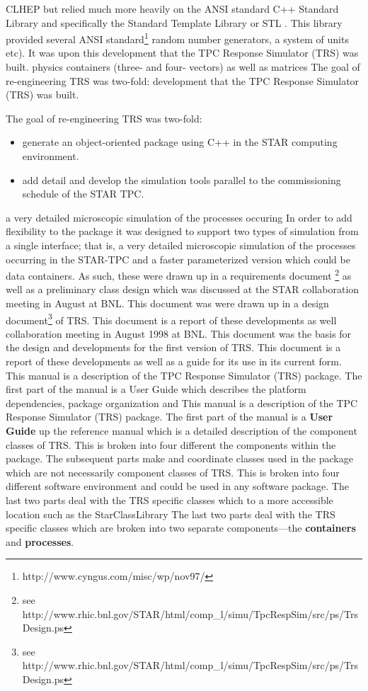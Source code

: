 \documentclass[twoside]{article}
\newcommand{\name}[1]{\textsf{#1}}%
\begin{document}
CLHEP  but relied much more heavily on the
ANSI standard C++ Standard Library and specifically the Standard Template
Library or STL .  This library provided several
ANSI  standard\footnote{http://www.cyngus.com/misc/wp/nov97/} 
random number generators, a system of units etc).  It was upon this
development that the TPC Response Simulator (TRS) was built.
physics containers (three- and four- vectors) as well as matrices
The goal of re-engineering TRS was two-fold:
development that the \name{TPC Response Simulator} (\name{TRS}) was built.

The goal of re-engineering \name{TRS} was two-fold:
\begin{itemize}
  \item generate an object-oriented package using C++ in the
    STAR computing environment.
  \item add detail and develop the simulation tools parallel to the
    commissioning schedule of the STAR TPC.
\end{itemize}
a very detailed microscopic simulation of the processes occuring
In order to add flexibility to the package it was designed to
support two types of simulation from a single interface; that is,
a very detailed microscopic simulation of the processes occurring
in the STAR-TPC and a faster parameterized version which could be
data containers.  As such, these were drawn up in a requirements document
\footnote{see http://www.rhic.bnl.gov/STAR/html/comp\_l/simu/TpcRespSim/src/ps/TrsDesign.ps}
as well as a  preliminary class design which was discussed at the STAR 
collaboration meeting in August at BNL.  This document was
were drawn up in a design document\footnote{see http://www.rhic.bnl.gov/STAR/html/comp\_l/simu/TpcRespSim/src/ps/TrsDesign.ps} 
of TRS.  This document is a report of these developments as well
collaboration meeting in August 1998 at BNL.  This document was
the basis for the design and developments for the first version
of \name{TRS}.  This document is a report of these developments as well
as a guide for its use in its current form.
This manual is a description of the TPC Response Simulator (TRS) 
package.  The first part of the manual is a User Guide which
describes the platform dependencies, package organization and
This manual is a description of the \name{TPC Response Simulator} 
(\name{TRS}) package.  The first part of the manual is a {\bf User Guide} 
up the reference manual which is a detailed description of the
component classes of TRS.  This is broken into four different 
the components within the package.  The subsequent parts make
and coordinate classes used in the package which are not necessarily
component classes of \name{TRS}.  This is broken into four different 
software environment and could be used in any software package.
The last two parts deal with the TRS specific classes which
to a more accessible location such as the \name{StarClassLibrary} 
The last two parts deal with the \name{TRS} specific classes which
are broken into two separate components---the {\bf containers}
and {\bf processes}.
\end{document}

